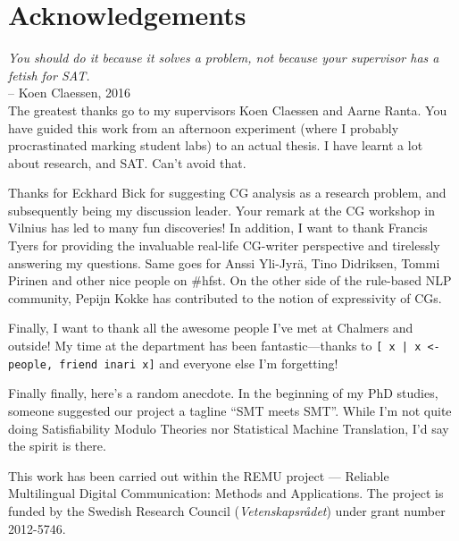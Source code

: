 \chapter*{Acknowledgements}\label{chp:acknowledgements}


\emph{You should do it because it solves a problem, not because your supervisor has a fetish for SAT.} \\
-- Koen Claessen, 2016 \\


The greatest thanks go to my supervisors Koen Claessen and Aarne Ranta. 
You have guided this work from an afternoon experiment (where I probably procrastinated marking student labs) to an actual thesis. I have learnt a lot about research,  and SAT. Can't avoid that.


Thanks for Eckhard Bick for suggesting CG analysis as a research
problem, and subsequently being my discussion leader. 
Your remark at the CG workshop in Vilnius has led to many fun discoveries!
In addition, I want to thank Francis Tyers for providing the invaluable real-life CG-writer perspective and tirelessly answering my questions. Same goes for Anssi Yli-Jyrä, Tino Didriksen, Tommi Pirinen and other nice people on \#hfst. On the other side of the rule-based NLP community, Pepijn Kokke has contributed to the notion of expressivity of CGs.

Finally, I want to thank all the awesome people I've met at Chalmers and outside! 
My time at the department has been fantastic---thanks to 
\texttt{[ x | x <- people, friend inari x]}  and everyone else I'm forgetting! 









Finally finally, here's a random anecdote. 
In the beginning of my PhD studies, someone suggested our project 
a tagline ``SMT meets SMT''. While I'm not quite doing Satisfiability
Modulo Theories nor Statistical Machine Translation, I'd say the spirit is there.






\vfill\noindent
This work has been carried out within the REMU project — Reliable Multilingual Digital Communication: Methods and Applications.
The project is funded by the Swedish Research Council (\emph{Vetenskapsrådet}) under grant number 2012-5746.

